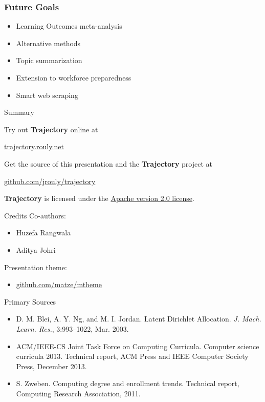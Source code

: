 \documentclass[10pt, compress]{beamer}
\begin{document}
\begin{frame}
  \frametitle{Future Goals}
  \begin{itemize}
    \item Learning Outcomes meta-analysis
    \item Alternative methods
    \item Topic summarization
    \item Extension to workforce preparedness
    \item Smart web scraping
  \end{itemize}
\end{frame}


\begin{frame}{Summary}

  Try out \textbf{Trajectory} online at

  \begin{center}\url{trajectory.rouly.net}\end{center}

  Get the source of this presentation and the \textbf{Trajectory} project
  at

  \begin{center}\url{github.com/jrouly/trajectory}\end{center}

  \vfill

  \textbf{Trajectory} is licensed under the
  \href{http://www.apache.org/licenses/LICENSE-2.0}{Apache version 2.0
  license}.

\end{frame}


\begin{frame}{Credits}
  Co-authors:
  \begin{itemize}
    \item Huzefa Rangwala
    \item Aditya Johri
  \end{itemize}

  Presentation theme:
  \begin{itemize}\item\url{github.com/matze/mtheme}\end{itemize}
\end{frame}


\begin{frame}{Primary Sources}
  \begin{itemize}
    \item D. M. Blei, A. Y. Ng, and M. I. Jordan. Latent Dirichlet Allocation.
      \emph{J. Mach. Learn. Res.}, 3:993–1022, Mar. 2003.
    \item ACM/IEEE-CS Joint Task Force on Computing
      Curricula. Computer science curricula 2013. Technical
      report, ACM Press and IEEE Computer Society
      Press, December 2013.
    \item S. Zweben. Computing degree and enrollment trends.
      Technical report, Computing Research Association,
      2011.
  \end{itemize}
\end{frame}


\end{document}
